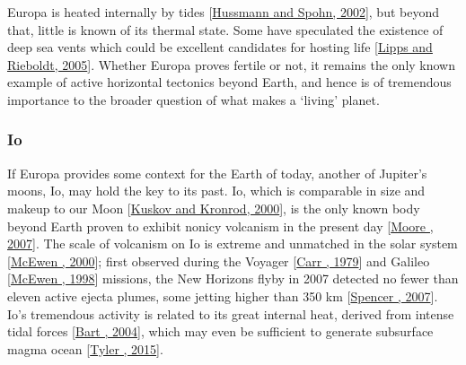 \documentclass[letterpaper,10pt,english]{jupyterBook}
\begin{document}
\sphinxAtStartPar
Europa is heated internally by tides {[}\hyperlink{cite.references:id7}{Hussmann and Spohn, 2002}{]}, but beyond that, little is known of its thermal state. Some have speculated the existence of deep sea vents which could be excellent candidates for hosting life {[}\hyperlink{cite.references:id142}{Lipps and Rieboldt, 2005}{]}. Whether Europa proves fertile or not, it remains the only known example of active horizontal tectonics beyond Earth, and hence is of tremendous importance to the broader question of what makes a ‘living’ planet.


\subsubsection{Io}
\label{\detokenize{content/chapter_01_background/main:io}}
\sphinxAtStartPar
If Europa provides some context for the Earth of today, another of Jupiter’s moons, Io, may hold the key to its past. Io, which is comparable in size and makeup to our Moon {[}\hyperlink{cite.references:id593}{Kuskov and Kronrod, 2000}{]}, is the only known body beyond Earth proven to exhibit non\sphinxhyphen{}icy volcanism in the present day {[}\hyperlink{cite.references:id592}{Moore , 2007}{]}. The scale of volcanism on Io is extreme and unmatched in the solar system {[}\hyperlink{cite.references:id591}{McEwen , 2000}{]}; first observed during the Voyager {[}\hyperlink{cite.references:id595}{Carr , 1979}{]} and Galileo {[}\hyperlink{cite.references:id599}{McEwen , 1998}{]} missions, the New Horizons flyby in 2007 detected no fewer than eleven active ejecta plumes, some jetting higher than 350 km {[}\hyperlink{cite.references:id590}{Spencer , 2007}{]}. Io’s tremendous activity is related to its great internal heat, derived from intense tidal forces {[}\hyperlink{cite.references:id127}{Bart , 2004}{]}, which may even be sufficient to generate subsurface magma ocean {[}\hyperlink{cite.references:id596}{Tyler , 2015}{]}.
\end{document}
